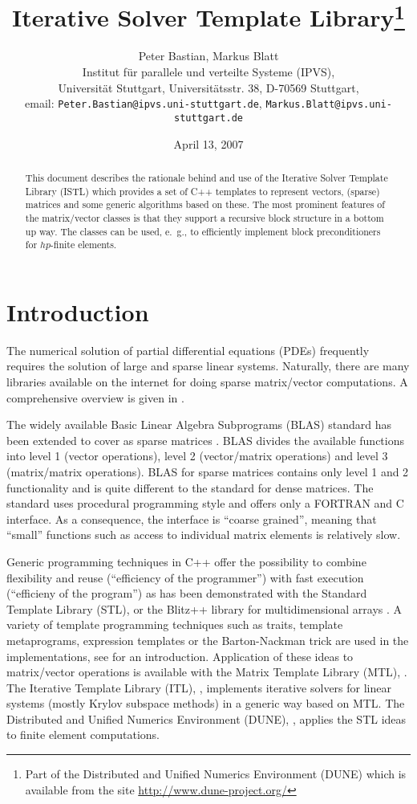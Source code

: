 \documentclass[11pt]{article}
\title{Iterative Solver Template Library\thanks{Part of the
    Distributed and Unified Numerics Environment (DUNE) which is
    available from the site
    \url{http://www.dune-project.org/}}}
\author{%
Peter Bastian, Markus Blatt\\
Institut f\"ur parallele und verteilte Systeme (IPVS),\\
Universit\"at Stuttgart, Universit\"atsstr. 38, D-70569 Stuttgart, \\
email: \texttt{Peter.Bastian@ipvs.uni-stuttgart.de}, \texttt{Markus.Blatt@ipvs.uni-stuttgart.de}}
\date{April 13, 2007}
\begin{document}
\maketitle

\begin{abstract}
This document describes the rationale behind and use of the Iterative
Solver Template Library (ISTL) which provides a set of C++
templates to represent vectors, (sparse) matrices and some generic
algorithms based on these. The most prominent features of the
matrix/vector classes is that they support a recursive block structure
in a bottom up way. The classes can be used, e.~g., to efficiently implement
block preconditioners for $hp$-finite elements.
\end{abstract}

\begin{multicols}{2}
{\small\tableofcontents}
\end{multicols}

\section{Introduction}

The numerical solution of partial differential equations (PDEs) frequently requires the
solution of large and sparse linear systems. Naturally,
there are many libraries available on the internet for doing sparse matrix/vector
computations. A comprehensive overview is given in \cite{LALinks}. 

The
widely available Basic Linear Algebra Subprograms (BLAS) standard has
been extended to cover as sparse matrices \cite{BLASTForum}. BLAS
divides the available functions into level 1 (vector operations),
level 2 (vector/matrix operations) and level 3 (matrix/matrix
operations). BLAS for sparse matrices contains only level 1 and 2
functionality and is quite different to the standard for dense
matrices. The standard uses procedural programming style and offers
only a FORTRAN and C interface. As a consequence, the interface is
``coarse grained'', meaning that ``small'' functions such as access to
individual matrix elements is relatively slow. 

Generic programming techniques in C++ offer the possibility to combine
flexibility and reuse (``efficiency of the programmer'') with fast
execution (``efficieny of the program'') as has been demonstrated with
the Standard Template Library (STL), \cite{Stroustrup} or the Blitz++
library for multidimensional arrays \cite{Blitz}. A variety of
template programming techniques such as traits, template metaprograms,
expression templates or the Barton-Nackman trick are used in the
implementations, see \cite{BN,Veldhui99} for an introduction.
Application of these ideas to matrix/vector operations is available
with the Matrix Template Library (MTL), \cite{MTL,MTL_SciTools98}. The Iterative
Template Library (ITL), \cite{ITL}, implements iterative solvers for
linear systems (mostly Krylov subspace methods) in a generic way based
on MTL. The Distributed and Unified Numerics Environment (DUNE),
\cite{Dune,DuneWeb}, applies the STL ideas to finite element
computations. 
\end{document}
